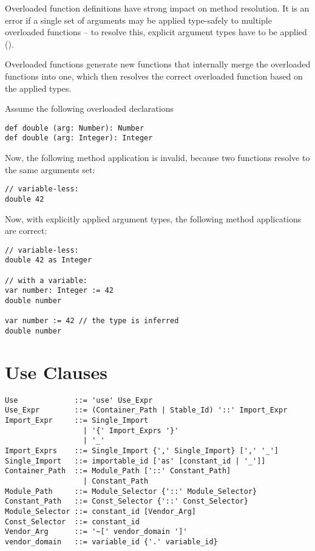 Overloaded function definitions have strong impact on method resolution. It is an error if a single set of arguments may be applied type-safely to multiple overloaded functions -- to resolve this, explicit argument types have to be applied ().

Overloaded functions generate new functions that internally merge the overloaded functions into one, which then resolves the correct overloaded function based on the applied types.

\example Assume the following overloaded declarations
\begin{lstlisting}
def double (arg: Number): Number
def double (arg: Integer): Integer
\end{lstlisting}
Now, the following method application is invalid, because two functions resolve to the same arguments set: 
\begin{lstlisting}
// variable-less:
double 42
\end{lstlisting}
Now, with explicitly applied argument types, the following method applications are correct:
\begin{lstlisting}
// variable-less:
double 42 as Integer

// with a variable:
var number: Integer := 42
double number

var number := 42 // the type is inferred
double number
\end{lstlisting}

\section{Use Clauses}
\label{sec:use-clauses}

\syntax\begin{lstlisting}
Use             ::= 'use' Use_Expr
Use_Expr        ::= (Container_Path | Stable_Id) '::' Import_Expr
Import_Expr     ::= Single_Import
                  | '{' Import_Exprs '}'
                  | '_'
Import_Exprs    ::= Single_Import {',' Single_Import} [',' '_']
Single_Import   ::= importable_id ['as' [constant_id | '_']]
Container_Path  ::= Module_Path ['::' Constant_Path]
                  | Constant_Path
Module_Path     ::= Module_Selector {'::' Module_Selector}
Constant_Path   ::= Const_Selector {'::' Const_Selector}
Module_Selector ::= constant_id [Vendor_Arg]
Const_Selector  ::= constant_id
Vendor_Arg      ::= '~[' vendor_domain ']'
vendor_domain   ::= variable_id {'.' variable_id}
\end{lstlisting}

